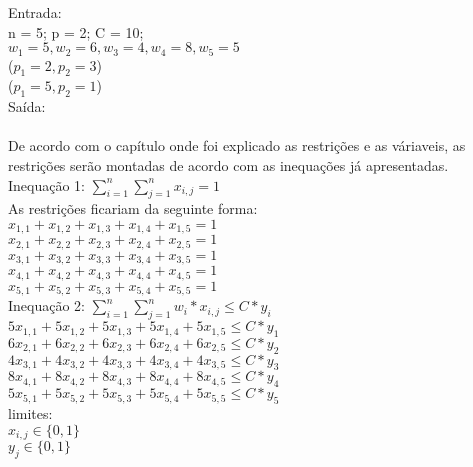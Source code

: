     \noindent Entrada:\\
      \indent n = 5; p = 2; C = 10;\\
      \indent \(w_{1} = 5, w_{2} = 6, w_{3} = 4, w_{4} = 8, w_{5} = 5\)\\
      \indent (\(p_{1} = 2, p_{2} = 3\))\\
      \indent (\(p_{1} = 5, p_{2} = 1\))\\
    \noindent Saída:\\
        \\

       De acordo com o capítulo onde foi explicado as restrições e as váriaveis, as restrições serão montadas de acordo com as inequações já apresentadas. \\

      \noindent Inequação 1: \( \sum_{i=1}^{n} \sum_{j=1}^{n} x_{i,j} = 1\) \\
        \noindent As restrições ficariam da seguinte forma:\\
        \indent \( x_{1,1} + x_{1,2} + x_{1,3} + x_{1,4} + x_{1,5} = 1 \)\\
        \indent \( x_{2,1} + x_{2,2} + x_{2,3} + x_{2,4} + x_{2,5} = 1\)\\
        \indent \( x_{3,1} + x_{3,2} + x_{3,3} + x_{3,4} + x_{3,5} = 1 \)\\
        \indent \( x_{4,1} + x_{4,2} + x_{4,3} + x_{4,4} + x_{4,5} = 1 \)\\
        \indent \( x_{5,1} + x_{5,2} + x_{5,3} + x_{5,4} + x_{5,5} = 1 \)\\

      \noindent Inequação 2: \( \sum_{i=1}^{n} \sum_{j=1}^{n} w_{i}*x_{i,j} \leq C*y_{i}\) \\
        \indent \( 5x_{1,1} + 5x_{1,2} + 5x_{1,3} + 5x_{1,4} + 5x_{1,5} \leq C*y_{1} \)\\
        \indent \( 6x_{2,1} + 6x_{2,2} + 6x_{2,3} + 6x_{2,4} + 6x_{2,5} \leq C*y_{2} \)\\
        \indent \( 4x_{3,1} + 4x_{3,2} + 4x_{3,3} + 4x_{3,4} + 4x_{3,5} \leq C*y_{3} \)\\
        \indent \( 8x_{4,1} + 8x_{4,2} + 8x_{4,3} + 8x_{4,4} + 8x_{4,5} \leq C*y_{4} \)\\
        \indent \( 5x_{5,1} + 5x_{5,2} + 5x_{5,3} + 5x_{5,4} + 5x_{5,5} \leq C*y_{5} \)\\

      \noindent limites: \\
        \indent \( x_{i,j} \in \{0,1\}\) \\
        \indent \( y_{j} \in \{0,1\}\) \\
        

